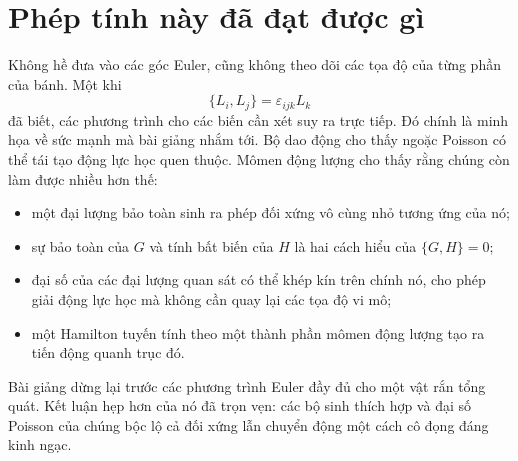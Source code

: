 \begin{classroomqa}
\end{classroomqa}

\begin{classroomqa}
\end{classroomqa}

\section{Phép tính này đã đạt được gì}

Không hề đưa vào các góc Euler, cũng không theo dõi các tọa độ của từng phần của
bánh. Một khi
\[
  \{L_i,L_j\}=\varepsilon_{ijk}L_k
\]
đã biết, các phương trình cho các biến cần xét suy ra trực tiếp.
Đó chính là minh họa về sức mạnh mà bài giảng nhắm tới. Bộ dao động cho thấy
ngoặc Poisson có thể tái tạo động lực học quen thuộc. Mômen động lượng cho thấy
rằng chúng còn làm được nhiều hơn thế:
\begin{itemize}
  \item một đại lượng bảo toàn sinh ra phép đối xứng vô cùng nhỏ tương ứng của nó;
  \item sự bảo toàn của \(G\) và tính bất biến của \(H\) là hai cách hiểu của
  \(\{G,H\}=0\);
  \item đại số của các đại lượng quan sát có thể khép kín trên chính nó, cho phép giải
  động lực học mà không cần quay lại các tọa độ vi mô;
  \item một Hamilton tuyến tính theo một thành phần mômen động lượng tạo ra
  tiến động quanh trục đó.
\end{itemize}
Bài giảng dừng lại trước các phương trình Euler đầy đủ cho một vật rắn tổng quát.
Kết luận hẹp hơn của nó đã trọn vẹn: các bộ sinh thích hợp và đại số Poisson của chúng
bộc lộ cả đối xứng lẫn chuyển động một cách cô đọng đáng kinh ngạc.